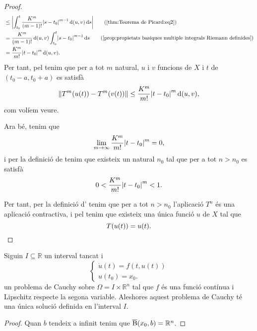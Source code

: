 \documentclass[../../Main.tex]{subfiles}
\begin{document}
\begin{theorem}
\begin{proof}
\begin{align*}
				&\leq\abs{\int_{t_{0}}^{t}\frac{K^{m}}{(m-1)!}\abs{s-t_{0}}^{m-1}\distancia(u,v)\diff s}\tag{\ref{thm:Teorema de Picard:eq2}}\\
				&=\frac{K^{m}}{(m-1)!}\distancia(u,v)\int_{t_{0}}^{t}\abs{s-t_{0}}^{m-1}\diff s\tag{\ref{prop:propietats basiques multiple integrals Riemann definides}}\\
				&=\frac{K^{m}}{m!}\abs{t-t_{0}}^{m}\distancia(u,v).%
			\end{align*}
			Per tant, pel  tenim que per a tot \(m\) natural, \(u\) i \(v\) funcions de \(X\) i \(t\) de \((t_{0}-a,t_{0}+a)\) es satisfà
			\[
			    \norm{T^{m}(u(t))-T^{m}(v(t))}\leq\frac{K^{m}}{m!}\abs{t-t_{0}}^{m}\distancia(u,v),
			\]
			com volíem veure.
			
			Ara bé, tenim que
			\[
			    \lim_{m\to\infty}\frac{K^{m}}{m!}\abs{t-t_{0}}^{m}=0,
			\]%
			i per la definició de  tenim que existeix un natural \(n_{0}\) tal que per a tot \(n>n_{0}\) es satisfà
			\[
			    0<{\frac{K^{m}}{m!}\abs{t-t_{0}}^{m}}<1.
			\]
			
			Per tant, per la definició d' tenim que per a tot \(n>n_{0}\) l'aplicació \(T^{n}\) és una aplicació contractiva, i pel \corollari{}  tenim que existeix una única funció \(u\) de \(X\) tal que
			\[
			    T(u(t))=u(t).\qedhere
			\]
		\end{proof}
	\end{theorem}
	\begin{corollary}
		\label{cor:Teorema de Picard}
		Siguin \(I\subseteq\mathbb{R}\) un interval tancat i
		\[\begin{cases}
			\displaystyle \dot{u}(t)=f(t,u(t)) \\
			\displaystyle u(t_{0})=x_{0}.
		\end{cases}\]
		un problema de Cauchy sobre \(\Omega=I\times\mathbb{R}^{n}\) tal que \(f\) és una funció contínua i Lipschitz respecte la segona variable.
		Aleshores aquest problema de Cauchy té una única solució definida en l'interval \(I\).
		\begin{proof}
			Quan \(b\) tendeix a infinit tenim que \(\overline{\operatorname{B}}(x_{0},b)=\mathbb{R}^{n}\).
		\end{proof}
	\end{corollary}
\end{document}
